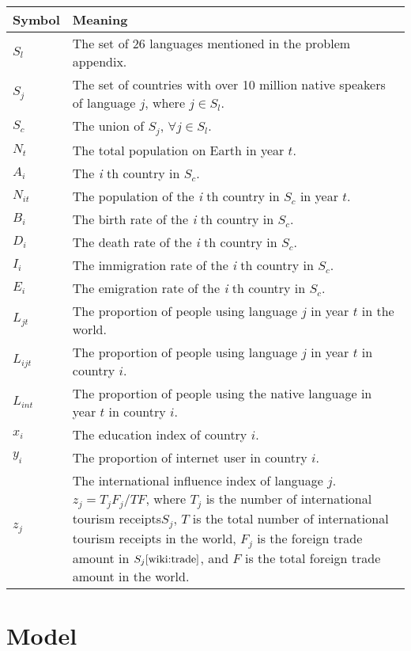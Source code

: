 \documentclass{mcmthesis}
\begin{document}
\begin{tabularx}{\textwidth}{l|X}
\hline
  \textbf{Symbol} & \textbf{Meaning} \\
\hline
    $S_l$ & The set of 26 languages mentioned in the problem appendix.\\ \hline
    $S_j$ & The set of countries with over 10 million native speakers of language $j$, where $j \in S_l$.\\ \hline
    $S_c$ & The union of $S_j$, $\forall j \in S_l$.\\ \hline
    $N_t$ & The total population on Earth in year $t$.\\ \hline
    $A_i$ & The \textit{i} th country in $S_c$.\\ \hline
    $N_{it}$ & The population of the \textit{i} th country in $S_c$ in year $t$.\\ \hline
    $B_i$ & The birth rate of the \textit{i} th country in $S_c$.\\ \hline
    $D_i$ & The death rate of the \textit{i} th country in $S_c$.\\ \hline
    $I_i$ & The immigration rate of the \textit{i} th country in $S_c$.\\ \hline
    $E_i$ & The emigration rate of the \textit{i} th country in $S_c$.\\ \hline
    $L_{jt}$ & The proportion of people using language $j$ in year $t$ in the world.\\ \hline
    $L_{ijt}$ & The proportion of people using language $j$ in year $t$ in country $i$.\\ \hline
    $L_{int}$ & The proportion of people using the native language in year $t$ in country $i$.\\ \hline
    $x_i$ & The education index\cite{wiki:edu} of country $i$.\\ \hline
    $y_i$ & The proportion of internet user in country $i$\cite{wiki:internet}.\\ \hline
    $z_j$ & The international influence index of language $j$. $z_j=T_j F_j/TF$, where $T_j$ is the number of international tourism receipts$S_j$\cite{wiki:travel}, $T$ is the total number of international tourism receipts in the world, $F_j$ is the foreign trade amount in $S_j\cite{wiki:trade}$, and $F$ is the total foreign trade amount in the world.\\ \hline

\end{tabularx}


\section{Model}
\end{document}
